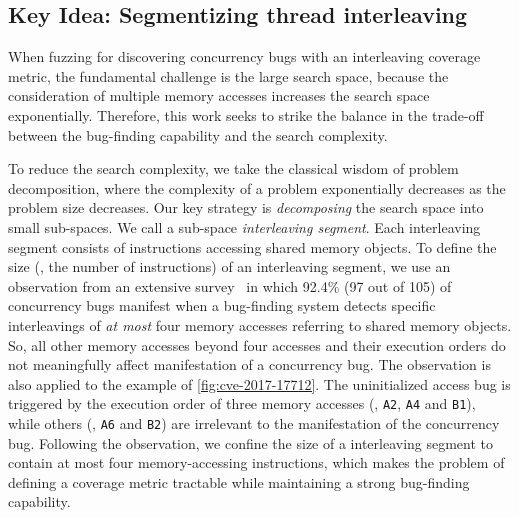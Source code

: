 \subsection{Key Idea: Segmentizing thread interleaving}
\label{ss:overview}


When fuzzing for discovering concurrency bugs with an interleaving
coverage metric, the fundamental challenge is the large search space,
because the consideration of multiple memory accesses increases the
search space exponentially.
%
Therefore, this work seeks to strike the balance in the trade-off
between the bug-finding capability and the search complexity.

%
To reduce the search complexity, we take the classical wisdom of
problem decomposition, where the complexity of a problem exponentially
decreases as the problem size decreases.
%
Our key strategy is \textit{decomposing} the search space into small
sub-spaces. We call a sub-space \textit{interleaving segment}.
%
Each interleaving segment consists of instructions accessing 
shared memory objects.
To define the size (\ie, the number of instructions) of an
interleaving segment, we use an observation from an extensive
survey~\cite{learningfrommistakes} in which 92.4\% (97 out of 105) of
concurrency bugs manifest when a bug-finding system detects specific
interleavings of \textit{at most} four memory accesses referring to
shared memory objects.
%
So, all other memory accesses beyond four accesses and their execution
orders do not meaningfully affect manifestation of a concurrency bug.
%
The observation is also applied to the example of
\autoref{fig:cve-2017-17712}. The uninitialized access bug is
triggered by the execution order of three memory accesses (\eg,
\texttt{A2}, \texttt{A4} and \texttt{B1}), while others (\eg,
\texttt{A6} and \texttt{B2}) are irrelevant to the manifestation of
the concurrency bug.
Following the observation,  we confine the size of a interleaving segment 
to contain at most four memory-accessing instructions,
which makes the problem of defining a coverage metric tractable while maintaining a strong bug-finding capability.


